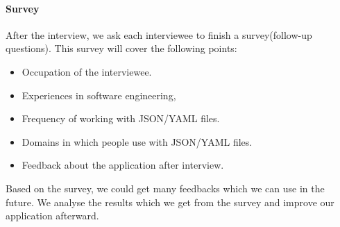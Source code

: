 \paragraph{Survey}
After the interview, we ask each interviewee to finish a survey(follow-up questions).
This survey will cover the following points:
\begin{itemize}
    \item Occupation of the interviewee.
    \item Experiences in software engineering,
    \item Frequency of working with JSON/YAML files.
    \item Domains in which people use with JSON/YAML files.
    \item Feedback about the application after interview.
\end{itemize}
Based on the survey, we could get many feedbacks which we can use in the future.
We analyse the results which we get from the survey and improve our application afterward.

